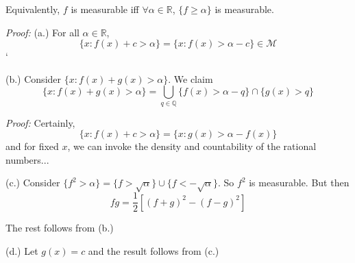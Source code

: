 \documentclass[12pt]{report}
\newcommand{\R}{\mathbb{R}}
\newcommand{\Q}{\mathbb{Q}}
\newcommand{\M}{\mathcal{M}}
\newenvironment*{tbox}[2][gray]{
    \begin{tcolorbox}[
        parbox=false,
        colback=#1!5!white,
        colframe=#1!75!black,
        breakable,
        title={#2}
    ]}
    {\end{tcolorbox}}
\newenvironment*{proof}[1][blue]{
\begin{tcolorbox}[
    parbox=false,
    colback=#1!5!white,
    colframe=#1!75!black,
    breakable
]}
{\end{tcolorbox}}
\begin{document}
    Equivalently, $f$ is measurable iff $\forall \alpha \in \R$, $\{f \geq \alpha\}$ is measurable. 

    \begin{tbox}{\textbf{Proposition:} If $f, g$ are measurable, so is
            \begin{enumerate}[label=(\alph*)]
                \item $f + c$
                \item $f + g$
                \item $fg$
                \item $cf$
            \end{enumerate} 
            for $c \in \R \setminus \{0\}$}
        \emph{Proof:}
        (a.) For all $\alpha \in \R$,
        \[\{x: f(x) + c > \alpha\} = \{x: f(x) > \alpha - c\} \in \M\] `
        
        (b.) Consider $\{x: f(x) + g(x) > \alpha\}$. We claim 
        \[\{x: f(x) + g(x) > \alpha\} = \bigcup_{q \in \Q} \{f(x) > \alpha - q\} \cap \{g(x) > q\}\]

        \begin{proof}[red]
            \emph{Proof:} Certainly, 
            \[\{x: f(x) + c > \alpha\} = \{x: g(x) > \alpha - f(x)\}\] 
            and for fixed $x$, we can invoke the density and countability of the rational numbers...
        \end{proof}

        (c.) Consider $\{f^2 > \alpha\} = \{f > \sqrt{\alpha}\} \cup \{f < -\sqrt{\alpha}\}$. So $f^2$ is measurable. But then
        \[fg = \frac{1}{2}\left[(f + g)^2 - (f - g)^2\right]\] 

        The rest follows from (b.)

        (d.) Let $g(x) = c$ and the result follows from (c.) 
    \end{tbox}
\end{document}
